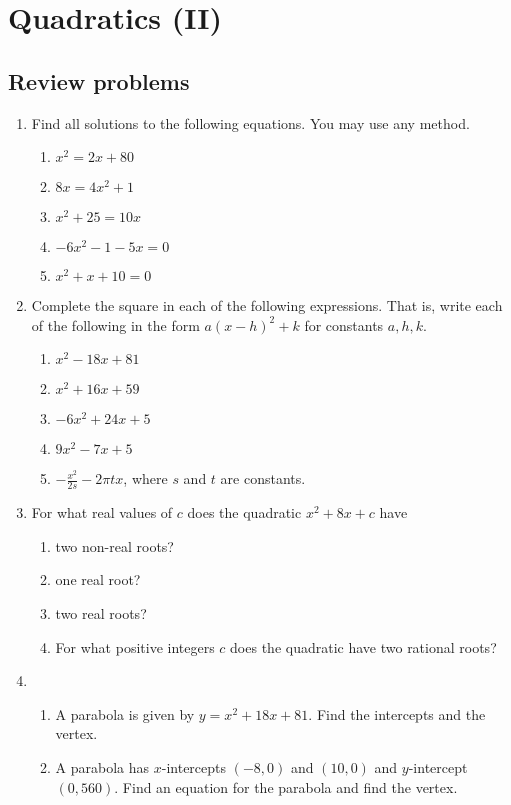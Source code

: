 \section{Quadratics (II)}

\subsection{Review problems}

\begin{enumerate}
\item Find all solutions to the following equations. You may use any method.
\begin{enumerate}
\item $x^2 = 2x + 80$
\item $8x = 4x^2 + 1$
\item $x^2 + 25 = 10x$
\item $-6x^2 - 1 - 5x = 0$
\item $x^2 + x + 10 = 0$
\end{enumerate}
\item Complete the square in each of the following expressions. That is, write each of the following in the form $a(x - h)^2 + k$ for constants $a,h,k$.
\begin{enumerate}
\item $x^2 - 18x + 81$
\item $x^2 + 16x + 59$
\item $-6x^2 + 24x + 5$
\item $9x^2 - 7x + 5$
\item $-\frac{x^2}{2s} - 2\pi tx$, where $s$ and $t$ are constants.
\end{enumerate}
\item For what real values of $c$ does the quadratic $x^2 + 8x + c$ have
\begin{enumerate}
\item two non-real roots?
\item one real root?
\item two real roots?
\item For what positive integers $c$ does the quadratic have two rational roots?
\end{enumerate}
\item \begin{enumerate}
\item A parabola is given by $y = x^2 + 18x + 81$. Find the intercepts and the vertex.
\item A parabola has $x$-intercepts $(-8,0)$ and $(10,0)$ and $y$-intercept $(0, 560)$. Find an equation for the parabola and find the vertex.

\end{enumerate}
\end{enumerate}
